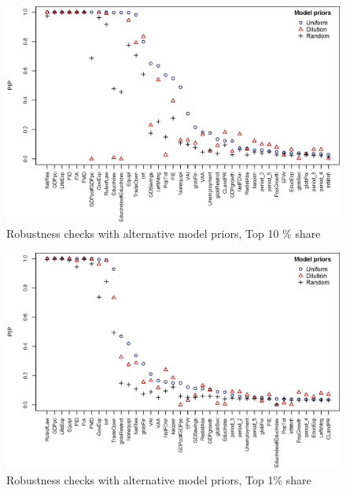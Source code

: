 \begin{refsection}
\begin{figure}
  \caption{Robustness checks with alternative model priors, Top 10
  \% share}
  \label{ch4fig:top10_comp}
  \centering
  \includegraphics[width=\textwidth, keepaspectratio]{figures/ch4/model_priors_comparison_top10}
\end{figure}

\begin{figure}
  \caption{Robustness checks with alternative model priors, Top 1\% share}
  \label{ch4fig:top1_comp}
  \centering
  \includegraphics[width=\textwidth, keepaspectratio]{figures/ch4/model_priors_comparison_top1}
\end{figure}


\end{refsection}
